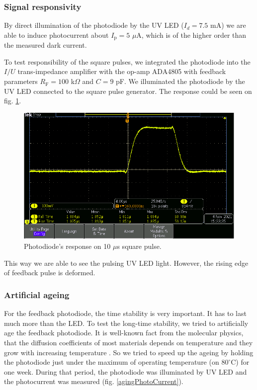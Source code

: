 \subsubsection{Signal responsivity}
By direct illumination of the photodiode by the UV LED ($I_d = 7.5 $ mA) we are able to induce photocurrent about $I_\textrm{p} = 5$ $\mu$A, which is of the higher order than the measured dark current.
\par
To test responsibility of the square pulses, we integrated the photodiode into the $I/U$ trans-impedance amplifier with the op-amp ADA4805 with feedback parameters $R_\textrm{F} = 100$ k$\Omega$ and $C = 9$ pF. We illuminated the photodiode by the UV LED connected to the square pulse generator. The response could be seen on fig. \ref{response}.

\begin{figure}[H]
 \centering
 \includegraphics[scale=0.5]{./pictures/pulse}
 \caption{Photodiode's response on 10 $\mu$s square pulse.}
 \label{response}
\end{figure}


This way we are able to see the pulsing UV LED light. However, the rising edge of feedback pulse is deformed. 

\subsubsection{Artificial ageing}
For the feedback photodiode, the time stability is very important. It has to last much more than the LED. To test the long-time stability, we tried to artificially age the feedback photodiode. It is well-known fact from the molecular physics, that the diffusion coefficients of most materials depends on temperature and they grow with increasing temperature \cite{Diff}. So we tried to speed up the ageing by holding the photodiode just under the maximum of operating temperature (on $80^{\circ}$C) for one week. During that period, the photodiode was illuminated by UV LED and the photocurrent was measured (fig. \ref{agingPhotoCurrent}).


